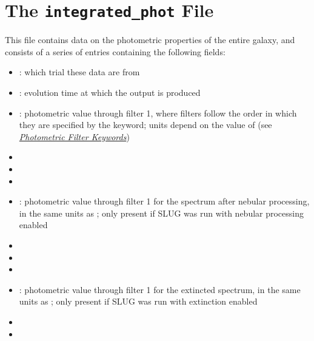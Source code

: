 \documentclass[letterpaper,10pt,english]{sphinxmanual}
\begin{document}
\section{The \texttt{integrated\_phot} File}
\label{output:the-integrated-phot-file}\label{output:ssec-int-phot-file}
This file contains data on the photometric properties of the entire galaxy, and consists of a series of entries containing the following fields:
\begin{itemize}
\item {} 
: which trial these data are from

\item {} 
: evolution time at which the output is produced

\item {} 
: photometric value through filter 1, where filters follow the order in which they are specified by the  keyword; units depend on the value of  (see {\hyperref[parameters:ssec\string-phot\string-keywords]{\emph{Photometric Filter Keywords}}})

\item {} 

\item {} 

\item {} 

\item {} 
: photometric value through filter 1 for the spectrum after nebular processing, in the same units as ; only present if SLUG was run with nebular processing enabled

\item {} 

\item {} 

\item {} 

\item {} 
: photometric value through filter 1 for the extincted spectrum, in the same units as ; only present if SLUG was run with extinction enabled

\item {} 

\item {} 


\end{itemize}
\end{document}
